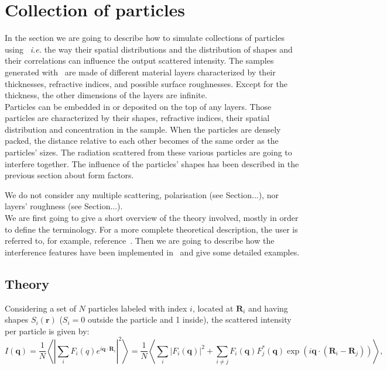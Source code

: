 \chapter{Collection of particles} \label{appendixinterf} 

In the section we are going to describe how to simulate collections of particles using \BornAgain\ \textit{i.e.} the way their spatial distributions and the distribution of shapes and their correlations can influence the output scattered intensity. The samples generated with \BornAgain\ are made of different material layers characterized by their thicknesses, refractive indices, and possible surface roughnesses. Except for the thickness, the other dimensions of the layers are infinite.\\ Particles can be embedded in or deposited on the top of any layers. Those particles are characterized by their shapes, refractive indices, their spatial distribution and concentration in the sample. When the particles are densely packed, the distance relative to each other becomes of the same order as the particles' sizes. The radiation scattered from these various particles are going to interfere together. The influence of the particles' shapes has been described in the previous section about form factors.

We do not consider any multiple scattering, polarisation (see Section...), nor layers' roughness (see Section...).\\ We are first going to give a short overview of the theory involved, mostly in order to define the terminology. For a more complete theoretical description, the user is referred to, for example, reference~\cite{ReLa09}. Then we are going to describe how the interference features have been implemented in \BornAgain\ and give some detailed examples.



\section{Theory}

Considering a set of $N$ particles labeled with index $i$, located at $\mathbf{R}_i$ and having shapes $S_i(\mathbf{r})$ ($S_i=0$ outside the particle and 1 inside), the scattered intensity per particle is given by:
\begin{equation}
  I(\mathbf{q}) = \frac{1}{N}\left\langle \left\lvert \sum_i F_i(q)e^{i \mathbf{q}\cdot \mathbf{R}_i}\right\rvert^{2} \right\rangle =\frac{1}{N}\left\langle \sum_i |F_i(\mathbf{q})|^2+\sum_{i \neq j} F_i(\mathbf{q}) F_j ^*(\mathbf{q})\exp(i\mathbf{q}\cdot (\mathbf{R}_i-\mathbf{R}_j)) \right\rangle, \label{eq:interfintensity}
\end{equation}

